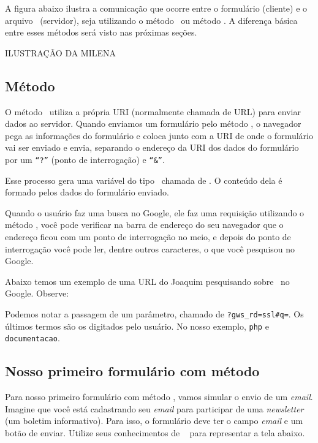 A figura abaixo ilustra a comunicação que ocorre entre o formulário (cliente) e o arquivo 
\php~(servidor), seja utilizando o método \metodoGET~ou método \metodoPOST. A diferença básica 
entre esses métodos será visto nas próximas seções. 

ILUSTRAÇÃO DA MILENA

\subsection{Método \metodoGET}
\label{metodo-get}

O método \metodoGET~utiliza a própria URI (normalmente chamada de URL) para enviar dados ao 
servidor. Quando enviamos um formulário pelo método \metodoGET, o navegador pega as informações 
do formulário e coloca junto com a URI de onde o formulário vai ser enviado e envia, 
separando o endereço da URI dos dados do formulário por um \texttt{``?''} (ponto de interrogação) 
e \texttt{``\&''}.

Esse processo gera uma variável do tipo \tipoarray~chamada de \variavelget. O conteúdo dela é
formado pelos dados do formulário enviado.

Quando o usuário faz uma busca no Google, ele faz uma requisição utilizando o método \metodoGET, 
você pode verificar na barra de endereço do seu navegador que o endereço ficou com um ponto de 
interrogação no meio, e depois do ponto de interrogação você pode ler, dentre outros caracteres, 
o que você pesquisou no Google.

Abaixo temos um exemplo de uma URL do Joaquim pesquisando sobre \php~no Google. Observe:


Podemos notar a passagem de um parâmetro, chamado de \texttt{?gws\_rd=ssl\#q=}. Os últimos termos
são os digitados pelo usuário. No nosso exemplo, \texttt{php} e \texttt{documentacao}.

\subsection{Nosso primeiro formulário com método \metodoGET}
\label{nosso-primeiro-formulario-com-metodo-get}

Para nosso primeiro formulário com método \metodoGET, vamos simular o envio de um 
\textit{email}. Imagine que você está cadastrando seu \textit{email} para participar 
de uma \textit{newsletter} (um boletim informativo). Para isso, o formulário deve 
ter o campo \textit{email} e um botão de enviar. Utilize seus conhecimentos de \html~
para representar a tela abaixo.

